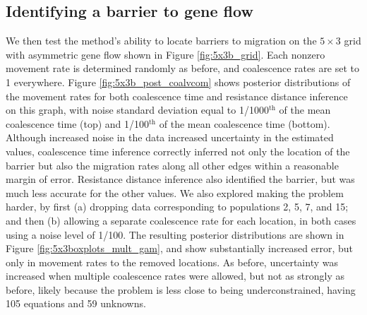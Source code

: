 \documentclass{article}
\begin{document}
\subsection*{Identifying a barrier to gene flow}
\label{sec:5x3b}


We then test the method's ability to locate barriers to migration
on the $5 \times 3$ grid with asymmetric gene flow shown in Figure \ref{fig:5x3b_grid}. 
Each nonzero movement rate is determined randomly as before,
and coalescence rates are set to 1 everywhere.
Figure \ref{fig:5x3b_post_coalvcom} shows posterior distributions of the movement rates
for both coalescence time and resistance distance inference
on this graph, with noise standard deviation equal to
1/1000${}^\text{th}$ of the mean coalescence time (top)
and 1/100${}^\text{th}$ of the mean coalescence time (bottom). 
Although increased noise in the data increased uncertainty in the estimated values,
coalescence time inference correctly inferred not only the location of the barrier
but also the migration rates along all other edges within a reasonable margin of error.
Resistance distance inference also identified the barrier,
but was much less accurate for the other values.
We also explored making the problem harder,
by first (a) dropping data corresponding to populations 2, 5, 7, and 15;
and then (b) allowing a separate coalescence rate for each location,
in both cases using a noise level of 1/100.
The resulting posterior distributions are shown in Figure \ref{fig:5x3boxplots_mult_gam},
and show substantially increased error,
but only in movement rates to the removed locations.
As before, uncertainty was increased when multiple coalescence rates were allowed,
but not as strongly as before, likely because the problem is less close to being underconstrained,
having 105 equations and 59 unknowns.
\end{document}

